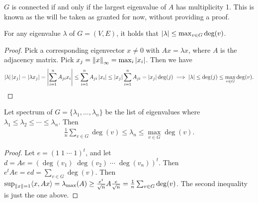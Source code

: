\begin{example}
    $G$ is connected if and only if the largest eigenvalue of $A$ has multiplicity 1. This is known as the  will be taken as granted for now, without providing a proof.
\end{example}

\begin{proposition}
    For any eigenvalue $\lambda$ of $G = (V,E)$, it holds that $\left| \lambda \right| \leq \max_{v \in G} \deg(v)$.
\end{proposition}
\begin{proof}
    Pick a corresponding eigenvector $x \neq 0$ with $Ax = \lambda x$, where $A$ is the adjacency matrix. Pick $x_{j} = \left\lVert x\right\rVert_{\infty} = \max_{i} \left| x_{i} \right|$. Then we have
    \begin{align}
        \left| \lambda \right|\left| x_{j} \right| = \left| \lambda x_{j} \right| = \left| \sum_{i=1}^{n} A_{ji} x_{i} \right| \leq \sum_{i=1}^{n} A_{ji} \left| x_{i} \right| \leq \left| x_{j} \right| \sum_{i=1}^{n} A_{ji} = \left| x_{j} \right| \deg (j) \implies \left| \lambda \right| \leq \deg (j) \leq \max_{v \in G} \deg(v).
    \end{align}
\end{proof}

\begin{proposition}
    Let spectrum of $G = \{\lambda_{1},\ldots,\lambda_{n}\}$ be the list of eigenvalues where $\lambda_{1} \leq \lambda_{2} \leq \cdots \leq \lambda_{n}$. Then
    \begin{align}
        \frac{1}{n}\sum_{v \in G} \deg(v) \leq \lambda_{n} \leq \max_{v \in G} \deg(v).
    \end{align}
\end{proposition}

\begin{proof}
    Let $e = (1\;1\;\cdots\;1)^{t}$, and let $d = Ae = (\deg(v_{1})\;\deg(v_{2})\;\cdots\;\deg(v_{n}))^{t}$. Then $e^{t}Ae = ed = \sum_{v \in G} \deg(v)$. Then $\sup_{\left\lVert x\right\rVert=1}\langle x,Ax\rangle = \lambda_{\max}(A) \geq \frac{e^{t}}{\sqrt{n}} A \frac{e}{\sqrt{n}} = \frac{1}{n}\sum_{v \in G} \deg(v)$. The second inequality is just the one above.
\end{proof}

